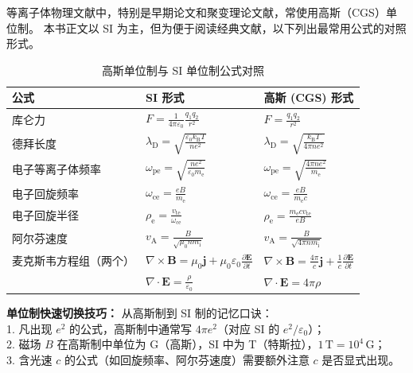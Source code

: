 \documentclass[12pt,a4paper,openany,oneside]{book}
\newcommand{\ii}{\mathrm{i}}
\newcommand{\ee}{\mathrm{e}}
\newcommand{\eps}{\varepsilon}
\newcommand{\vect}[1]{\bm{#1}}
\begin{document}
等离子体物理文献中，特别是早期论文和聚变理论文献，常使用高斯（CGS）单位制。
本书正文以 SI 为主，但为便于阅读经典文献，以下列出最常用公式的对照形式。

\begin{table}[htbp]
\centering
\caption{高斯单位制与 SI 单位制公式对照}
\small
\begin{tabular}{@{}lp{5.2cm}p{5.2cm}@{}}
\toprule
\textbf{公式} & \textbf{SI 形式} & \textbf{高斯 (CGS) 形式} \\
\midrule
库仑力 & $\displaystyle F=\frac{1}{4\pi\eps_0}\frac{q_1 q_2}{r^2}$ & $\displaystyle F=\frac{q_1 q_2}{r^2}$ \\
\midrule
德拜长度 & $\displaystyle \lambda_\mathrm{D}=\sqrt{\frac{\eps_0 k_\mathrm{B} T}{n e^2}}$ & $\displaystyle \lambda_\mathrm{D}=\sqrt{\frac{k_\mathrm{B} T}{4\pi n e^2}}$ \\
\midrule
电子等离子体频率 & $\displaystyle \omega_{\mathrm{p}\ee}=\sqrt{\frac{n e^2}{\eps_0 m_\ee}}$ & $\displaystyle \omega_{\mathrm{p}\ee}=\sqrt{\frac{4\pi n e^2}{m_\ee}}$ \\
\midrule
电子回旋频率 & $\displaystyle \omega_{\mathrm{c}\ee}=\frac{e B}{m_\ee}$ & $\displaystyle \omega_{\mathrm{c}\ee}=\frac{e B}{m_\ee c}$ \\
\midrule
电子回旋半径 & $\displaystyle \rho_\ee=\frac{v_{\mathrm{t}\ee}}{\omega_{\mathrm{c}\ee}}$ & $\displaystyle \rho_\ee=\frac{m_\ee c v_{\mathrm{t}\ee}}{e B}$ \\
\midrule
阿尔芬速度 & $\displaystyle v_\mathrm{A}=\frac{B}{\sqrt{\mu_0 n m_\ii}}$ & $\displaystyle v_\mathrm{A}=\frac{B}{\sqrt{4\pi n m_\ii}}$ \\
\midrule
麦克斯韦方程组（两个） & $\displaystyle \nabla\times\vect{B}=\mu_0\vect{j}+\mu_0\eps_0\frac{\partial\vect{E}}{\partial t}$ & $\displaystyle \nabla\times\vect{B}=\frac{4\pi}{c}\vect{j}+\frac{1}{c}\frac{\partial\vect{E}}{\partial t}$ \\
 & $\displaystyle \nabla\cdot\vect{E}=\frac{\rho}{\eps_0}$ & $\displaystyle \nabla\cdot\vect{E}=4\pi\rho$ \\
\bottomrule
\end{tabular}
\end{table}

\begin{tip}
\textbf{单位制快速切换技巧：}
从高斯制到 SI 制的记忆口诀：\\
1. 凡出现 $e^2$ 的公式，高斯制中通常写 $4\pi e^2$（对应 SI 的 $e^2/\eps_0$）；\\
2. 磁场 $B$ 在高斯制中单位为 G（高斯），SI 中为 T（特斯拉），$1\,\mathrm{T}=10^4\,\mathrm{G}$；\\
3. 含光速 $c$ 的公式（如回旋频率、阿尔芬速度）需要额外注意 $c$ 是否显式出现。
\end{tip}
\end{document}
